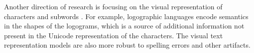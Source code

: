 Another direction of research is focusing on the visual representation of characters and subwords \cite{rust_language_2023,salesky_robust_2021,mansimov_towards_2020}. For example, logographic languages encode semantics in the shapes of the logograms, which is a source of additional information not present in the Unicode representation of the characters. The visual text representation models are also more robust to spelling errors and other artifacts.


